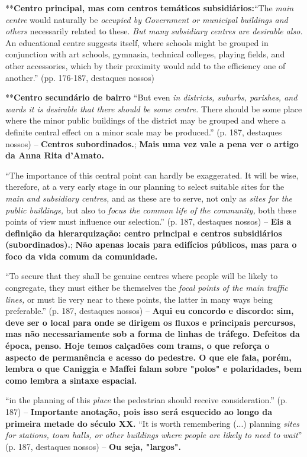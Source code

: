 \documentclass[12pt, a4paper]{book} %
\begin{document}
        **\textbf{Centro principal, mas com centros temáticos subsidiários:}``The \textit{main centre} would naturally be \textit{occupied by Government or municipal buildings and others} necessarily related to these. \textit{But many subsidiary centres are desirable also.} An educational centre suggests itself, where schools might be grouped in conjunction with art schools, gymnasia, technical colleges, playing fields, and other accessories, which by their proximity would add to the efficiency one of another.'' (pp. 176-187, destaques nossos)

        **\textbf{Centro secundário de bairro} ``But even \textit{in districts, suburbs, parishes, and wards it is desirable that there should be some centre.} There should be some place where the minor public buildings of the district may be grouped and where a definite central effect on a minor scale may be produced.'' (p. 187, destaques nossos) – \textbf{Centros subordinados.}; \textbf{Mais uma vez vale a pena ver o artigo da Anna Rita d'Amato.}

        ``The importance of this central point can hardly be exaggerated. It will be wise, therefore, at a very early stage in our planning to select suitable sites for the \textit{main and subsidiary centres,} and as these are to serve, not only as \textit{sites for the public buildings,} but also to \textit{focus the common life of the community,} both these points of view must influence our selection.'' (p. 187, destaques nossos) – \textbf{Eis a definição da hierarquização: centro principal e centros subsidiários (subordinados).}; \textbf{Não apenas locais para edifícios públicos, mas para o foco da vida comum da comunidade.}

        ``To secure that they shall be genuine centres where people will be likely to congregate, they must either be themselves the \textit{focal points of the main traffic lines,} or must lie very near to these points, the latter in many ways being preferable.'' (p. 187, destaques nossos) – \textbf{Aqui eu concordo e discordo: sim, deve ser o local para onde se dirigem os fluxos e principais percursos, mas não necessariamente sob a forma de linhas de tráfego. Defeitos da época, penso. Hoje temos calçadões com trams, o que reforça o aspecto de permanência e acesso do pedestre. O que ele fala, porém, lembra o que Caniggia e Maffei falam sobre "polos" e polaridades, bem como lembra a sintaxe espacial.}

        ``in the planning of this \textit{place} the pedestrian should receive consideration.'' (p. 187) – \textbf{Importante anotação, pois isso será esquecido ao longo da primeira metade do século XX.}
        ``It is worth remembering (...) planning \textit{sites for stations, town halls, or other buildings where people are likely to need to wait}'' (p. 187, destaques nossos) – \textbf{Ou seja, "largos".}
\end{document}
